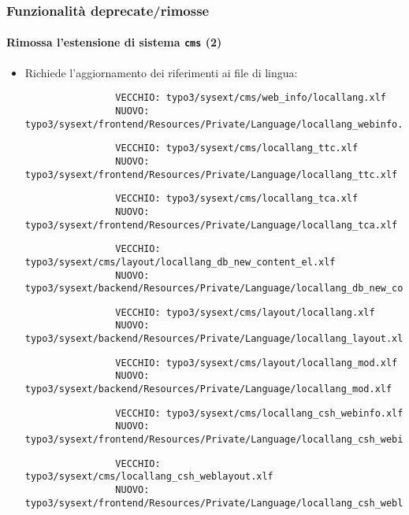 \begin{frame}[fragile]
	\frametitle{Funzionalità deprecate/rimosse}
	\framesubtitle{Rimossa l'estensione di sistema \texttt{cms} (2)}

	\lstset{basicstyle=\tiny\ttfamily}

	\begin{itemize}

		\item Richiede l'aggiornamento dei riferimenti ai file di lingua:


			\begin{lstlisting}
				VECCHIO: typo3/sysext/cms/web_info/locallang.xlf
				NUOVO: typo3/sysext/frontend/Resources/Private/Language/locallang_webinfo.xlf
			\end{lstlisting}
			\vspace{-0.3cm}
			\begin{lstlisting}
				VECCHIO: typo3/sysext/cms/locallang_ttc.xlf
				NUOVO: typo3/sysext/frontend/Resources/Private/Language/locallang_ttc.xlf
			\end{lstlisting}
			\vspace{-0.3cm}
			\begin{lstlisting}
				VECCHIO: typo3/sysext/cms/locallang_tca.xlf
				NUOVO: typo3/sysext/frontend/Resources/Private/Language/locallang_tca.xlf
			\end{lstlisting}
			\vspace{-0.3cm}
			\begin{lstlisting}
				VECCHIO: typo3/sysext/cms/layout/locallang_db_new_content_el.xlf
				NUOVO: typo3/sysext/backend/Resources/Private/Language/locallang_db_new_content_el.xlf
			\end{lstlisting}
			\vspace{-0.3cm}
			\begin{lstlisting}
				VECCHIO: typo3/sysext/cms/layout/locallang.xlf
				NUOVO: typo3/sysext/backend/Resources/Private/Language/locallang_layout.xlf
			\end{lstlisting}
			\vspace{-0.3cm}
			\begin{lstlisting}
				VECCHIO: typo3/sysext/cms/layout/locallang_mod.xlf
				NUOVO: typo3/sysext/backend/Resources/Private/Language/locallang_mod.xlf
			\end{lstlisting}
			\vspace{-0.3cm}
			\begin{lstlisting}
				VECCHIO: typo3/sysext/cms/locallang_csh_webinfo.xlf
				NUOVO: typo3/sysext/frontend/Resources/Private/Language/locallang_csh_webinfo.xlf
			\end{lstlisting}
			\vspace{-0.3cm}
			\begin{lstlisting}
				VECCHIO: typo3/sysext/cms/locallang_csh_weblayout.xlf
				NUOVO: typo3/sysext/frontend/Resources/Private/Language/locallang_csh_weblayout.xlf
			\end{lstlisting}


\end{itemize}
\end{frame}
